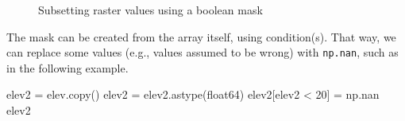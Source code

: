 \documentclass[
  letterpaper,
]{krantz}
\newenvironment{Shaded}{\begin{snugshade}}{\end{snugshade}}
\newcommand{\DecValTok}[1]{\textcolor[rgb]{0.68,0.00,0.00}{#1}}
\newcommand{\NormalTok}[1]{\textcolor[rgb]{0.00,0.23,0.31}{#1}}
\newcommand{\OperatorTok}[1]{\textcolor[rgb]{0.37,0.37,0.37}{#1}}
\newcommand{\StringTok}[1]{\textcolor[rgb]{0.13,0.47,0.30}{#1}}
\begin{document}
\begin{figure}

\begin{minipage}{0.33\linewidth}



\end{minipage}%
%
\begin{minipage}{0.33\linewidth}



\end{minipage}%
%
\begin{minipage}{0.33\linewidth}



\end{minipage}%

\caption{\label{fig-raster-subset}Subsetting raster values using a
boolean mask}

\end{figure}%

The mask can be created from the array itself, using condition(s). That
way, we can replace some values (e.g., values assumed to be wrong) with
\texttt{np.nan}, such as in the following example.

\begin{Shaded}
\begin{Highlighting}[]
\NormalTok{elev2 }\OperatorTok{=}\NormalTok{ elev.copy()}
\NormalTok{elev2 }\OperatorTok{=}\NormalTok{ elev2.astype(}\StringTok{\textquotesingle{}float64\textquotesingle{}}\NormalTok{)}
\NormalTok{elev2[elev2 }\OperatorTok{\textless{}} \DecValTok{20}\NormalTok{] }\OperatorTok{=}\NormalTok{ np.nan}
\NormalTok{elev2}
\end{Highlighting}
\end{Shaded}
\end{document}
